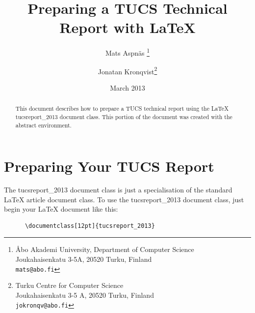 \documentclass[12pt]{tucsreport_2013}
\begin{document}
  \title{Preparing a TUCS Technical Report with {\LaTeX} }

  \author{Mats Aspn\"as
      \thanks{{\AA}bo Akademi University, Department of Computer Science\\
      Joukahaisenkatu 3-5A, 20520 Turku, Finland\\
      {\tt mats@abo.fi}}
    \and Jonatan Kronqvist\thanks{Turku Centre for Computer Science\\
        Joukahaisenkatu 3-5 A, 20520 Turku, Finland\\
        {\tt jokronqv@abo.fi}}}

  \date{March 2013}		%


  \maketitle

  \begin{abstract}
    This document describes how to prepare a TUCS technical report using
      the {\LaTeX} \textsf{tucsreport\_2013} document class.
    This portion of the document was created with the \textsf{abstract}
      environment.
  \end{abstract}


  \section{Preparing Your TUCS Report}

    The \textsf{tucsreport\_2013} document class is just a specialisation of the
      standard {\LaTeX} \cite{latex, companion} \textsf{article} document class.
    To use the \textsf{tucsreport\_2013} document class, just begin your
      {\LaTeX} document like this:
    \begin{verbatim}
      \documentclass[12pt]{tucsreport_2013}
    \end{verbatim}
\end{document}
